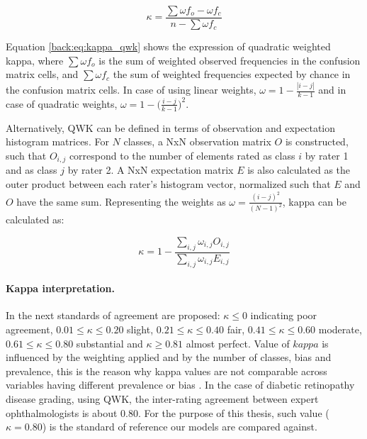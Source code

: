 \begin{equation}
\kappa = \frac{\sum \omega f_o - \omega f_c}{n - \sum \omega f_c}
\label{back:eq:kappa_qwk}
\end{equation}

Equation \ref{back:eq:kappa_qwk} shows the expression of quadratic weighted kappa, where $\sum \omega f_o$ is the sum of weighted observed frequencies in the confusion matrix cells, and $\sum \omega f_c$ the sum of weighted frequencies expected by chance in the confusion matrix cells. In case of using linear weights, $\omega = 1 - \frac{|i-j|}{k-1}$ and in case of quadratic weights, $\omega = 1 - \big( \frac{i-j}{k-1} \big)^2$.  %

Alternatively, QWK can be defined in terms of observation and expectation histogram matrices. For $N$ classes, a NxN observation matrix $O$ is constructed, such that $O_{i,j}$ correspond to the number of elements rated as class $i$ by rater 1 and as class $j$ by rater 2. A NxN expectation matrix $E$ is also calculated as the outer product between each rater's histogram vector, normalized such that $E$ and $O$ have the same sum. Representing the weights as $\omega = \frac{(i-j)^2}{(N-1)^2}$, kappa can be calculated as:

\begin{equation}
\kappa = 1 - \frac{\sum_{i,j} \omega_{i,j} O_{i,j}}{\sum_{i,j} \omega_{i,j} E_{i,j}}
\label{back:eq:kappa_qwk2}
\end{equation}

\paragraph{Kappa interpretation.} In \citep{landis1977measurement} the next standards of agreement are proposed: $\kappa \leq 0$ indicating poor agreement, $0.01 \leq \kappa \leq 0.20$ slight, $0.21 \leq \kappa \leq 0.40$ fair, $0.41 \leq \kappa \leq 0.60$ moderate, $0.61 \leq \kappa \leq 0.80$ substantial and $\kappa \geq 0.81$ almost perfect. Value of $kappa$ is influenced by the weighting applied and by the number of classes, bias and prevalence, this is the reason why kappa values are not comparable across variables having different prevalence or bias \citep{sim2005kappa}. In the case of diabetic retinopathy disease grading, using QWK, the inter-rating agreement between expert ophthalmologists is about $0.80$. For the purpose of this thesis, such value ($\kappa = 0.80$) is the standard of reference our models are compared against.

